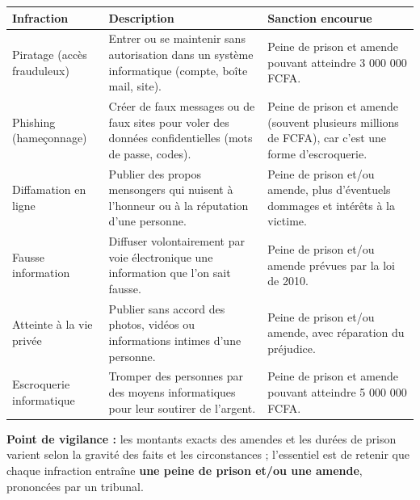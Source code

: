 \documentclass[11pt]{article}
\begin{document}
\begin{corrige}
\begin{center}
\begin{tabularx}{\linewidth}{|l|X|X|}
\hline
\rowcolor{popblueL} \textbf{Infraction} & \textbf{Description} & \textbf{Sanction encourue} \\
\hline
Piratage (accès frauduleux) & Entrer ou se maintenir sans autorisation dans un système informatique (compte, boîte mail, site). & Peine de prison et amende pouvant atteindre 3 000 000 FCFA. \\
\hline
Phishing (hameçonnage) & Créer de faux messages ou de faux sites pour voler des données confidentielles (mots de passe, codes). & Peine de prison et amende (souvent plusieurs millions de FCFA), car c'est une forme d'escroquerie. \\
\hline
Diffamation en ligne & Publier des propos mensongers qui nuisent à l'honneur ou à la réputation d'une personne. & Peine de prison et/ou amende, plus d'éventuels dommages et intérêts à la victime. \\
\hline
Fausse information & Diffuser volontairement par voie électronique une information que l'on sait fausse. & Peine de prison et/ou amende prévues par la loi de 2010. \\
\hline
Atteinte à la vie privée & Publier sans accord des photos, vidéos ou informations intimes d'une personne. & Peine de prison et/ou amende, avec réparation du préjudice. \\
\hline
Escroquerie informatique & Tromper des personnes par des moyens informatiques pour leur soutirer de l'argent. & Peine de prison et amende pouvant atteindre 5 000 000 FCFA. \\
\hline
\end{tabularx}
\end{center}
\textbf{Point de vigilance :} les montants exacts des amendes et les durées de prison varient selon la gravité des faits et les circonstances ; l'essentiel est de retenir que chaque infraction entraîne \textbf{une peine de prison et/ou une amende}, prononcées par un tribunal.
\end{corrige}
\end{document}
